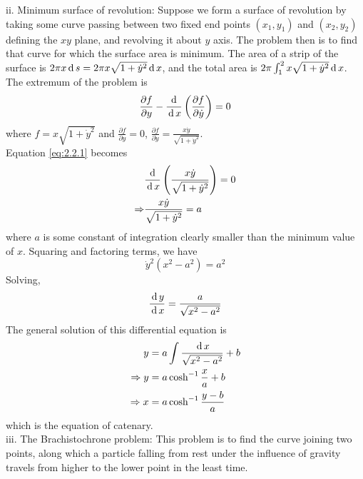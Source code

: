 \documentclass[12pt]{article}
\begin{document}
\begin{soln}
    ii. Minimum surface of revolution: Suppose we form a surface of revolution by taking some curve passing between two fixed end points \((x_1,y_1)\) and \((x_2,y_2)\) defining the \(xy\) plane, and revolving it about \(y\) axis. The problem then is to find that curve for which the surface area is minimum. The area of a strip of the surface is \(2\pi x\,\mathrm{d}\, s=2\pi x\sqrt{1+\dot{y}^2}\,\mathrm{d}\, x\), and the total area is \(2\pi \int_1^2 x\sqrt{1+\dot{y}^2}\,\mathrm{d}\, x\).\\
    The extremum of the problem is
    \begin{equation}
        \frac{\partial f}{\partial y}-\frac{\,\mathrm{d}\,}{\,\mathrm{d}\, x}\left( \frac{\partial f}{\partial \dot{y}} \right)=0\label{eq:2.2.1}
    \end{equation}
    where \(f=x\sqrt{1+\dot{y}^2}\) and \(\frac{\partial f}{\partial y}=0\), \(\frac{\partial f}{\partial \dot{y}}=\frac{x\dot{y}}{\sqrt{1+\dot{y}^2}}\).\\
     Equation \eqref{eq:2.2.1} becomes
     \begin{align*}
        & \frac{\,\mathrm{d}\,}{\,\mathrm{d}\, x}\left( \frac{x\dot{y}}{\sqrt{1+\dot{y}^2}} \right)=0\\
        \Rightarrow & \frac{x\dot{y}}{\sqrt{1+\dot{y}^2}}=a
     \end{align*}
     where \(a\) is some constant of integration clearly smaller than the minimum value of \(x\). Squaring and factoring terms, we have 
     \[\dot{y}^2(x^2-a^2)=a^2\]
     Solving,
     \[\frac{\,\mathrm{d}\, y}{\,\mathrm{d}\, x}=\frac{a}{\sqrt{x^2-a^2}}\]
     The general solution of this differential equation is
     \begin{align*}
        y&=a\int \frac{\,\mathrm{d}\, x}{\sqrt{x^2-a^2}}+b\\
        \Rightarrow y&=a \cosh^{-1} \frac{x}{a}+b\\
        \Rightarrow x&=a \cosh^{-1} \frac{y-b}{a}
     \end{align*}
     which is the equation of catenary.\\

     iii. The Brachistochrone problem: This problem is to find the curve joining two points, along which a particle falling from rest under the influence of gravity travels from higher to the lower point in the least time.


\end{soln}
\end{document}
